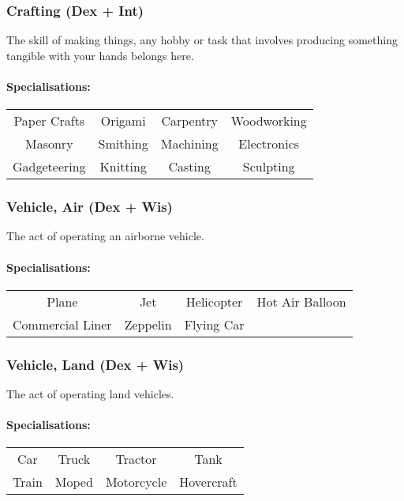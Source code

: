 \subsubsection{Crafting (Dex + Int)}
The skill of making things, any hobby or task that involves producing something tangible with your hands belongs here.

\paragraph{Specialisations:}
\begin{center}
    \begin{tabular}{c|c|c|c}
        Paper Crafts & Origami & Carpentry & Woodworking \\
        Masonry & Smithing & Machining & Electronics \\
        Gadgeteering & Knitting & Casting & Sculpting \\
    \end{tabular}
\end{center}

\subsubsection{Vehicle, Air (Dex + Wis)}
The act of operating an airborne vehicle.

\paragraph{Specialisations:}
\begin{center}
    \begin{tabular}{c|c|c|c}
        Plane & Jet & Helicopter & Hot Air Balloon \\
        Commercial Liner & Zeppelin & Flying Car \\
    \end{tabular}
\end{center}

\subsubsection{Vehicle, Land (Dex + Wis)}
The act of operating land vehicles.

\paragraph{Specialisations:}
\begin{center}
    \begin{tabular}{c|c|c|c}
        Car & Truck & Tractor & Tank \\
        Train & Moped & Motorcycle & Hovercraft
    \end{tabular}
\end{center}


